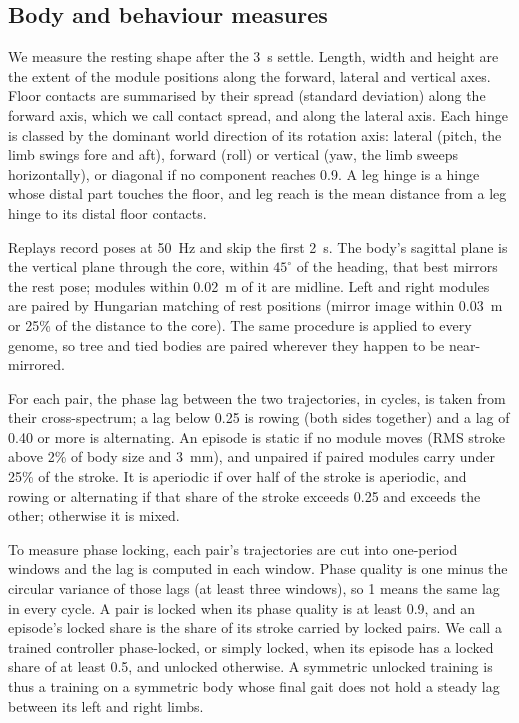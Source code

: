 \subsection{Body and behaviour measures}
\label{sec:measures}

We measure the resting shape after the \SI{3}{s} settle. Length, width and height are the extent of the module positions along the forward, lateral and vertical axes. Floor contacts are summarised by their spread (standard deviation) along the forward axis, which we call contact spread, and along the lateral axis. Each hinge is classed by the dominant world direction of its rotation axis: lateral (pitch, the limb swings fore and aft), forward (roll) or vertical (yaw, the limb sweeps horizontally), or diagonal if no component reaches 0.9. A leg hinge is a hinge whose distal part touches the floor, and leg reach is the mean distance from a leg hinge to its distal floor contacts.

Replays record poses at \SI{50}{Hz} and skip the first \SI{2}{s}. The body's sagittal plane is the vertical plane through the core, within $45^\circ$ of the heading, that best mirrors the rest pose; modules within \SI{0.02}{m} of it are midline. Left and right modules are paired by Hungarian matching of rest positions (mirror image within \SI{0.03}{m} or 25\% of the distance to the core). The same procedure is applied to every genome, so tree and tied bodies are paired wherever they happen to be near-mirrored.

For each pair, the phase lag between the two trajectories, in cycles, is taken from their cross-spectrum; a lag below 0.25 is rowing (both sides together) and a lag of 0.40 or more is alternating. An episode is static if no module moves (RMS stroke above 2\% of body size and \SI{3}{mm}), and unpaired if paired modules carry under 25\% of the stroke. It is aperiodic if over half of the stroke is aperiodic, and rowing or alternating if that share of the stroke exceeds 0.25 and exceeds the other; otherwise it is mixed.

To measure phase locking, each pair's trajectories are cut into one-period windows and the lag is computed in each window. Phase quality is one minus the circular variance of those lags (at least three windows), so 1 means the same lag in every cycle. A pair is locked when its phase quality is at least 0.9, and an episode's locked share is the share of its stroke carried by locked pairs. We call a trained controller phase-locked, or simply locked, when its episode has a locked share of at least 0.5, and unlocked otherwise. A symmetric unlocked training is thus a training on a symmetric body whose final gait does not hold a steady lag between its left and right limbs.


